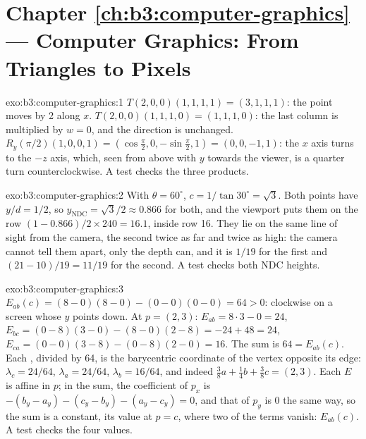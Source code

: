 \section*{Chapter \ref{ch:b3:computer-graphics} --- Computer Graphics: From Triangles to Pixels}

\begin{solution}{exo:b3:computer-graphics:1}
$T(2, 0, 0)(1, 1, 1, 1) = (3, 1, 1, 1)$: the point moves by 2 along $x$. $T(2, 0, 0)(1, 1, 1, 0) = (1, 1, 1, 0)$: the last column is multiplied by $w = 0$, and the direction is unchanged. $R_y(\pi/2)(1, 0, 0, 1) = (\cos\frac\pi2, 0, -\sin\frac\pi2, 1) = (0, 0, -1, 1)$: the $x$ axis turns to the $-z$ axis, which, seen from above with $y$ towards the viewer, is a quarter turn counterclockwise. A test checks the three products.
\end{solution}

\begin{solution}{exo:b3:computer-graphics:2}
With $\theta = 60^\circ$, $c = 1/\tan 30^\circ = \sqrt3$. Both points have $y/d = 1/2$, so $y_{\mathrm{NDC}} = \sqrt3/2 \approx 0.866$ for both, and the viewport puts them on the row $(1 - 0.866)/2 \times 240 = 16.1$, inside row 16. They lie on the same line of sight from the camera, the second twice as far and twice as high: the camera cannot tell them apart, only the depth can, and it is $1/19$ for the first and $(21 - 10)/19 = 11/19$ for the second. A test checks both NDC heights.
\end{solution}

\begin{solution}{exo:b3:computer-graphics:3}
$E_{ab}(c) = (8 - 0)(8 - 0) - (0 - 0)(0 - 0) = 64 > 0$: clockwise on a screen whose $y$ points down. At $p = (2, 3)$: $E_{ab} = 8 \cdot 3 - 0 = 24$, $E_{bc} = (0 - 8)(3 - 0) - (8 - 0)(2 - 8) = -24 + 48 = 24$, $E_{ca} = (0 - 0)(3 - 8) - (0 - 8)(2 - 0) = 16$. The sum is $64 = E_{ab}(c)$. Each , divided by 64, is the barycentric coordinate of the vertex opposite its edge: $\lambda_c = 24/64$, $\lambda_a = 24/64$, $\lambda_b = 16/64$, and indeed $\frac38 a + \frac14 b + \frac38 c = (2, 3)$. Each $E$ is affine in $p$; in the sum, the coefficient of $p_x$ is $-(b_y - a_y) - (c_y - b_y) - (a_y - c_y) = 0$, and that of $p_y$ is 0 the same way, so the sum is a constant, its value at $p = c$, where two of the terms vanish: $E_{ab}(c)$. A test checks the four values.
\end{solution}

